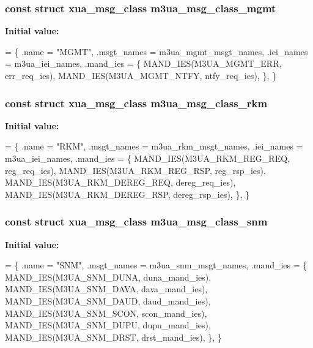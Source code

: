\subsubsection[{m3ua\+\_\+msg\+\_\+class\+\_\+mgmt}]{\setlength{\rightskip}{0pt plus 5cm}const struct {\bf xua\+\_\+msg\+\_\+class} m3ua\+\_\+msg\+\_\+class\+\_\+mgmt}\label{m3ua_8c_ac6878c5b045b1e7267b1a0b3afa364db}
{\bfseries Initial value\+:}
\begin{DoxyCode}
= \{
        .name = \textcolor{stringliteral}{"MGMT"},
        .msgt\_names = m3ua_mgmt_msgt_names,
        .iei\_names = m3ua_iei_names,
        .mand\_ies = \{
                MAND_IES(M3UA_MGMT_ERR, err_req_ies),
                MAND_IES(M3UA_MGMT_NTFY, ntfy_req_ies),
        \},
\}
\end{DoxyCode}
\subsubsection[{m3ua\+\_\+msg\+\_\+class\+\_\+rkm}]{\setlength{\rightskip}{0pt plus 5cm}const struct {\bf xua\+\_\+msg\+\_\+class} m3ua\+\_\+msg\+\_\+class\+\_\+rkm}\label{m3ua_8c_a7cb679c8ca9d252dfa766ec7f2fba44c}
{\bfseries Initial value\+:}
\begin{DoxyCode}
= \{
        .name = \textcolor{stringliteral}{"RKM"},
        .msgt\_names = m3ua_rkm_msgt_names,
        .iei\_names = m3ua_iei_names,
        .mand\_ies = \{
                MAND_IES(M3UA_RKM_REG_REQ, reg_req_ies),
                MAND_IES(M3UA_RKM_REG_RSP, reg_rsp_ies),
                MAND_IES(M3UA_RKM_DEREG_REQ, dereg_req_ies),
                MAND_IES(M3UA_RKM_DEREG_RSP, dereg_rsp_ies),
        \},
\}
\end{DoxyCode}
\subsubsection[{m3ua\+\_\+msg\+\_\+class\+\_\+snm}]{\setlength{\rightskip}{0pt plus 5cm}const struct {\bf xua\+\_\+msg\+\_\+class} m3ua\+\_\+msg\+\_\+class\+\_\+snm}\label{m3ua_8c_a35e9ebf716b800839c00351acc2af5df}
{\bfseries Initial value\+:}
\begin{DoxyCode}
= \{
        .name = \textcolor{stringliteral}{"SNM"},
        .msgt\_names = m3ua_snm_msgt_names,
        .mand\_ies = \{
                MAND_IES(M3UA_SNM_DUNA, duna_mand_ies),
                MAND_IES(M3UA_SNM_DAVA, dava_mand_ies),
                MAND_IES(M3UA_SNM_DAUD, daud_mand_ies),
                MAND_IES(M3UA_SNM_SCON, scon_mand_ies),
                MAND_IES(M3UA_SNM_DUPU, dupu_mand_ies),
                MAND_IES(M3UA_SNM_DRST, drst_mand_ies),
        \},
\}
\end{DoxyCode}
